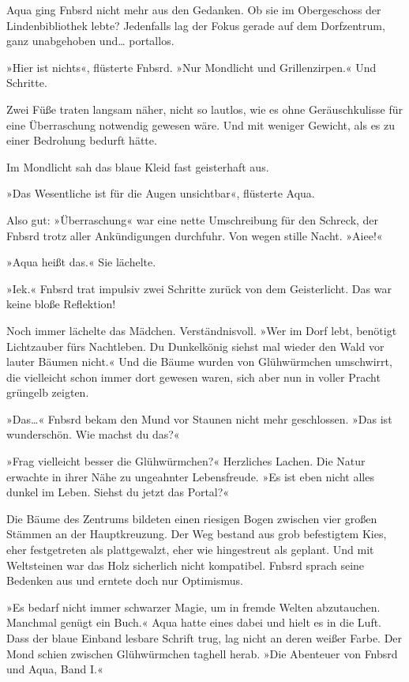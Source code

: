 Aqua ging Fnbsrd nicht mehr aus den Gedanken. Ob sie im Obergeschoss der Lindenbibliothek lebte? Jedenfalls lag der Fokus gerade auf dem Dorfzentrum, ganz unabgehoben und… portallos.

»Hier ist nichts«, flüsterte Fnbsrd. »Nur Mondlicht und Grillenzirpen.« Und Schritte.

Zwei Füße traten langsam näher, nicht so lautlos, wie es ohne Geräuschkulisse für eine Überraschung notwendig gewesen wäre. Und mit weniger Gewicht, als es zu einer Bedrohung bedurft hätte.

Im Mondlicht sah das blaue Kleid fast geisterhaft aus.

»Das Wesentliche ist für die Augen unsichtbar«, flüsterte Aqua.

Also gut: »Überraschung« war eine nette Umschreibung für den Schreck, der Fnbsrd trotz aller Ankündigungen durchfuhr. Von wegen stille Nacht. »Aiee!«

»Aqua heißt das.« Sie lächelte.

»Iek.« Fnbsrd trat impulsiv zwei Schritte zurück von dem Geisterlicht. Das war keine bloße Reflektion!

Noch immer lächelte das Mädchen. Verständnisvoll. »Wer im Dorf lebt, benötigt Lichtzauber fürs Nachtleben. Du Dunkelkönig siehst mal wieder den Wald vor lauter Bäumen nicht.« Und die Bäume wurden von Glühwürmchen umschwirrt, die vielleicht schon immer dort gewesen waren, sich aber nun in voller Pracht grüngelb zeigten.

»Das…« Fnbsrd bekam den Mund vor Staunen nicht mehr geschlossen. »Das ist wunderschön. Wie machst du das?«

»Frag vielleicht besser die Glühwürmchen?« Herzliches Lachen. Die Natur erwachte in ihrer Nähe zu ungeahnter Lebensfreude. »Es ist eben nicht alles dunkel im Leben. Siehst du jetzt das Portal?«

Die Bäume des Zentrums bildeten einen riesigen Bogen zwischen vier großen Stämmen an der Hauptkreuzung. Der Weg bestand aus grob befestigtem Kies, eher festgetreten als plattgewalzt, eher wie hingestreut als geplant. Und mit Weltsteinen war das Holz sicherlich nicht kompatibel. Fnbsrd sprach seine Bedenken aus und erntete doch nur Optimismus.

»Es bedarf nicht immer schwarzer Magie, um in fremde Welten abzutauchen. Manchmal genügt ein Buch.« Aqua hatte eines dabei und hielt es in die Luft. Dass der blaue Einband lesbare Schrift trug, lag nicht an deren weißer Farbe. Der Mond schien zwischen Glühwürmchen taghell herab. »Die Abenteuer von Fnbsrd und Aqua, Band I.«

